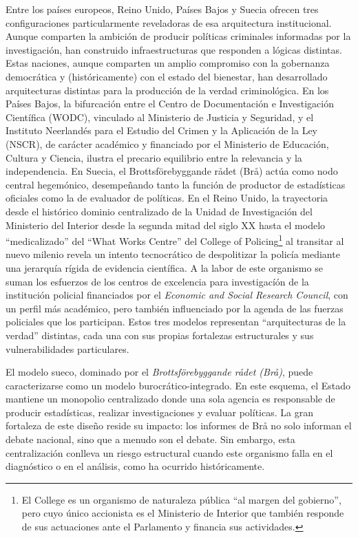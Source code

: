 \documentclass[
  spanish,
  letterpaper,
  DIV=11,
  numbers=noendperiod]{scrreprt}
\begin{document}
Entre los países europeos, Reino Unido, Países Bajos y Suecia ofrecen
tres configuraciones particularmente reveladoras de esa arquitectura
institucional. Aunque comparten la ambición de producir políticas
criminales informadas por la investigación, han construido
infraestructuras que responden a lógicas distintas. Estas naciones,
aunque comparten un amplio compromiso con la gobernanza democrática y
(históricamente) con el estado del bienestar, han desarrollado
arquitecturas distintas para la producción de la verdad criminológica.
En los Países Bajos, la bifurcación entre el Centro de Documentación e
Investigación Científica (WODC), vinculado al Ministerio de Justicia y
Seguridad, y el Instituto Neerlandés para el Estudio del Crimen y la
Aplicación de la Ley (NSCR), de carácter académico y financiado por el
Ministerio de Educación, Cultura y Ciencia, ilustra el precario
equilibrio entre la relevancia y la independencia. En Suecia, el
Brottsförebyggande rådet (Brå) actúa como nodo central hegemónico,
desempeñando tanto la función de productor de estadísticas oficiales
como la de evaluador de políticas. En el Reino Unido, la trayectoria
desde el histórico dominio centralizado de la Unidad de Investigación
del Ministerio del Interior desde la segunda mitad del siglo XX hasta el
modelo ``medicalizado'' del ``What Works Centre'' del College of
Policing\footnote{El College es un organismo de naturaleza pública ``al
  margen del gobierno'', pero cuyo único accionista es el Ministerio de
  Interior que también responde de sus actuaciones ante el Parlamento y
  financia sus actividades.} al transitar al nuevo milenio revela un
intento tecnocrático de despolitizar la policía mediante una jerarquía
rígida de evidencia científica. A la labor de este organismo se suman
los esfuerzos de los centros de excelencia para investigacíón de la
institución policial financiados por el \emph{Economic and Social
Research Council}, con un perfil más académico, pero también
influenciado por la agenda de las fuerzas policiales que los participan.
Estos tres modelos representan ``arquitecturas de la verdad'' distintas,
cada una con sus propias fortalezas estructurales y sus vulnerabilidades
particulares.

El modelo sueco, dominado por el \emph{Brottsförebyggande rådet (Brå)},
puede caracterizarse como un modelo burocrático-integrado. En este
esquema, el Estado mantiene un monopolio centralizado donde una sola
agencia es responsable de producir estadísticas, realizar
investigaciones y evaluar políticas. La gran fortaleza de este diseño
reside su impacto: los informes de Brå no solo informan el debate
nacional, sino que a menudo son el debate. Sin embargo, esta
centralización conlleva un riesgo estructural cuando este organismo
falla en el diagnóstico o en el análisis, como ha ocurrido
históricamente.
\end{document}
